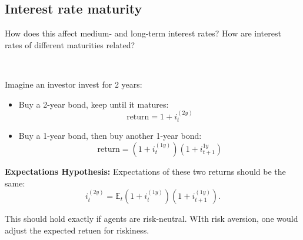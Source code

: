 \subsection{Interest rate maturity}

\begin{question}
    How does this affect medium- and long-term interest rates? How are interest rates of different maturities related?
\end{question}

\begin{eg}
    \ 

    Imagine an investor invest for 2 years:
    \begin{itemize}
        \item Buy a 2-year bond, keep until it matures: \[\text{return} = 1 + i_t^{(2y)}\]
        \item Buy a 1-year bond, then buy another 1-year bond: \[\text{return} = (1+i_t^{(1y)})(1+i_{t+1}^{1y})\]    
    \end{itemize}

    \textbf{Expectations Hypothesis:} Expectations of these two returns should be the same:
    \[i_t^{(2y)} = \mathbb{E}_t (1 + i_t^{(1y)})(1 + i_{t+1}^{(1y)}).\]

    This should hold exactly if agents are risk-neutral. WIth risk aversion, one would adjust the expected retuen for riskiness.
\end{eg}
